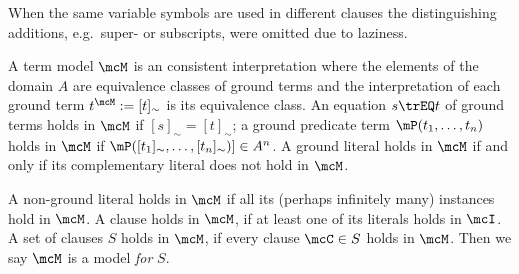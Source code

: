 %
\begin{remark}
When the same variable symbols are used in different clauses the distinguishing additions, e.g.~super- or subscripts, were omitted due to laziness.
\end{remark}
%
%
\begin{definition}\label{def:model}
A {\myem term model} $\mcM$ is an consistent interpretation where the elements of the domain $A$ 
are equivalence classes of ground terms
and the interpretation of each ground term $t^\mcM := [t]_\sim$ is its equivalence class.
An equation $s\trEQ t$ of ground terms holds in $\mcM$ if $[s]_\sim=[t]_\sim$;
a ground predicate term $\mP(t_1,\ldots,t_n)$ holds in $\mcM$ if $\mP([t_1]_\sim,\ldots,[t_n]_\sim)] \in A^n$.
A ground literal holds in $\mcM$ if and only if its complementary literal does not hold in $\mcM$.

A non-ground literal holds in $\mcM$ if all its 
(perhaps infinitely many)
instances hold in $\mcM$.
A clause holds in $\mcM$, if at least one of its literals holds in $\mcI$.
A set of clauses $S$ holds in $\mcM$, if every clause $\mcC\in S$ holds in $\mcM$.
Then we say $\mcM$ is a model {\em for} $S$.

\end{definition}
%
%

